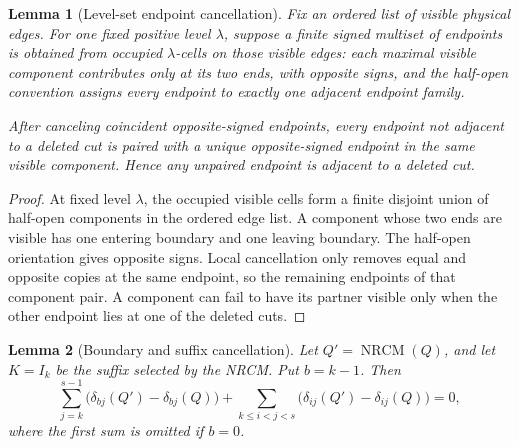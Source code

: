 \documentclass[10pt]{article}
\newtheorem{lemma}{Lemma}
\newcommand{\NRCM}{\operatorname{NRCM}}
\begin{document}
\begin{lemma}[Level-set endpoint cancellation]
Fix an ordered list of visible physical edges.  For one fixed positive level
\(\lambda\), suppose a finite signed multiset of endpoints is obtained from
occupied \(\lambda\)-cells on those visible edges: each maximal visible
component contributes only at its two ends, with opposite signs, and the
half-open convention assigns every endpoint to exactly one adjacent endpoint
family.

After canceling coincident opposite-signed endpoints, every endpoint not
adjacent to a deleted cut is paired with a unique opposite-signed endpoint in
the same visible component.  Hence any unpaired endpoint is adjacent to a
deleted cut.
\end{lemma}

\begin{proof}
At fixed level \(\lambda\), the occupied visible cells form a finite disjoint
union of half-open components in the ordered edge list.  A component whose two
ends are visible has one entering boundary and one leaving boundary.  The
half-open orientation gives opposite signs.  Local cancellation only removes
equal and opposite copies at the same endpoint, so the remaining endpoints of
that component pair.  A component can fail to have its partner visible only
when the other endpoint lies at one of the deleted cuts.
\end{proof}

\begin{lemma}[Boundary and suffix cancellation]
Let \(Q'=\NRCM(Q)\), and let \(K=I_k\) be the suffix selected by the NRCM.
Put \(b=k-1\).  Then
\[
  \sum_{j=k}^{s-1}\bigl(\delta_{bj}(Q')-\delta_{bj}(Q)\bigr)
  +
  \sum_{k\le i<j<s}
    \bigl(\delta_{ij}(Q')-\delta_{ij}(Q)\bigr)
  =0,
\]
where the first sum is omitted if \(b=0\).
\end{lemma}
\end{document}
